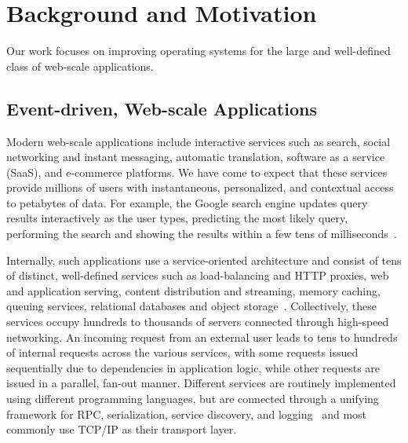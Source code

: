 
\section{Background and Motivation}
\label{sec:motivation}

Our work focuses on improving operating systems for the large and
well-defined class of web-scale applications. 


\subsection{Event-driven, Web-scale Applications}
\label{sec:motivation:web}

Modern web-scale applications include interactive services such as
search, social networking and instant messaging, automatic
translation, software as a service (SaaS), and e-commerce platforms.
We have come to expect that these services provide millions of users
with instantaneous, personalized, and contextual access to petabytes
of data.  For example, the Google search engine updates query results
interactively as the user types, predicting the most likely query,
performing the search and showing the results within a few tens of
milliseconds~\cite{DBLP:journals/cacm/DeanB13}.

Internally, such applications use a service-oriented architecture and
consist of tens of distinct, well-defined services such as
load-balancing and HTTP proxies, web and application serving, content
distribution and streaming, memory caching, queuing services,
relational databases and object
storage~\cite{DBLP:conf/sosp/DeCandiaHJKLPSVV07,Alonso:2010:WSC,Eriksen:2013:YSF}.
Collectively, these services occupy hundreds to thousands of servers
connected through high-speed networking. An incoming request from an
external user leads to tens to hundreds of internal requests across
the various services, with some requests issued sequentially due to
dependencies in application logic, while other requests are issued in
a parallel, fan-out manner.  Different services are routinely
implemented using different programming languages, but are connected
through a unifying framework for RPC, serialization, service
discovery, and logging~\cite{protocolbuffers, thrift,
  finagle} and most commonly use TCP/IP as their transport
layer.

